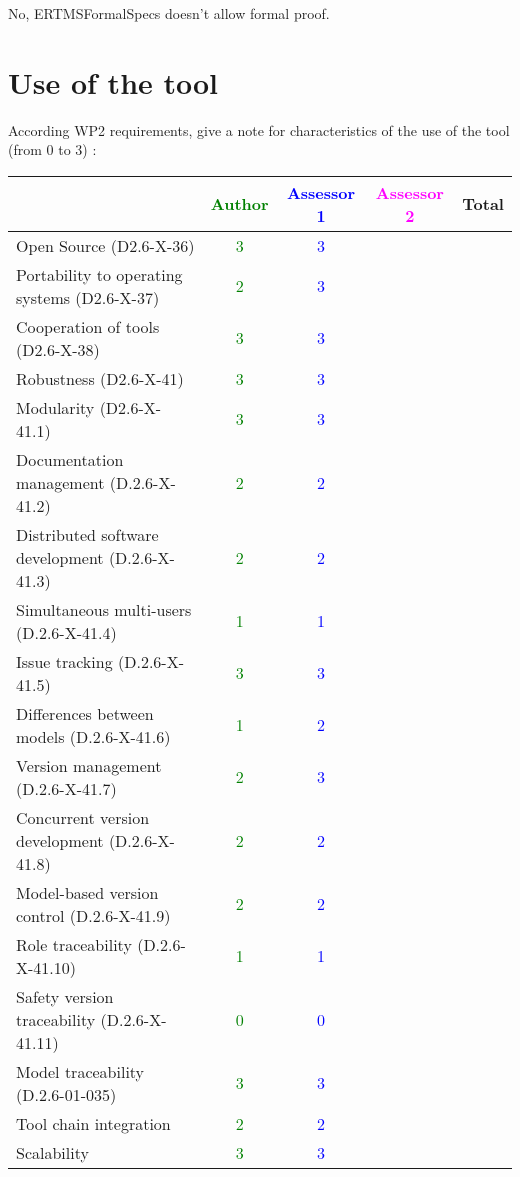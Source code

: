 \begin{author_comment}
No, ERTMSFormalSpecs doesn't allow formal proof. 
\end{author_comment}

\section{Use of the tool}

According WP2 requirements, give a note for characteristics of the use of the tool (from 0 to 3) :

\begin{tabular}{|l | c | c | c | c|}
\hline
& \textcolor{green}{Author} & \textcolor{blue}{Assessor 1} & \textcolor{magenta}{Assessor 2} & Total \\
\hline 
Open Source (D2.6-X-36) & \textcolor{green}{3} & \textcolor{blue}{3} & &  \\
\hline 
Portability to operating systems (D2.6-X-37) & \textcolor{green}{2} & \textcolor{blue}{3} & &  \\
\hline
Cooperation of tools (D2.6-X-38) & \textcolor{green}{3} & \textcolor{blue}{3} & &  \\
\hline
Robustness (D2.6-X-41) & \textcolor{green}{3} & \textcolor{blue}{3} & & \\
\hline
Modularity (D2.6-X-41.1) & \textcolor{green}{3} & \textcolor{blue}{3} & & \\
\hline
Documentation management (D.2.6-X-41.2) & \textcolor{green}{2} & \textcolor{blue}{2} & & \\
\hline
Distributed software development (D.2.6-X-41.3)  & \textcolor{green}{2} & \textcolor{blue}{2} & & \\
\hline
Simultaneous multi-users (D.2.6-X-41.4)   & \textcolor{green}{1} & \textcolor{blue}{1} & & \\
\hline
Issue tracking (D.2.6-X-41.5) & \textcolor{green}{3} & \textcolor{blue}{3} & & \\
\hline
Differences between models (D.2.6-X-41.6) & \textcolor{green}{1} & \textcolor{blue}{2} & & \\
\hline
Version management (D.2.6-X-41.7) & \textcolor{green}{2} & \textcolor{blue}{3} & & \\
\hline
Concurrent version development (D.2.6-X-41.8) & \textcolor{green}{2} & \textcolor{blue}{2} & & \\
\hline
Model-based version control (D.2.6-X-41.9) & \textcolor{green}{2} & \textcolor{blue}{2} & & \\
\hline
Role traceability (D.2.6-X-41.10) & \textcolor{green}{1} & \textcolor{blue}{1} & & \\
\hline
Safety version traceability (D.2.6-X-41.11) & \textcolor{green}{0} & \textcolor{blue}{0} & & \\
\hline
Model traceability (D.2.6-01-035) & \textcolor{green}{3} & \textcolor{blue}{3} & & \\
\hline
Tool chain integration & \textcolor{green}{2} & \textcolor{blue}{2} & & \\
\hline
Scalability & \textcolor{green}{3} & \textcolor{blue}{3} & & \\
\hline
\end{tabular}

